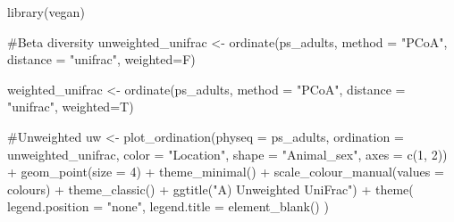 \documentclass[
  letterpaper,
  DIV=11,
  numbers=noendperiod]{scrartcl}
\newenvironment{Shaded}{\begin{snugshade}}{\end{snugshade}}
\newcommand{\AttributeTok}[1]{\textcolor[rgb]{0.40,0.45,0.13}{#1}}
\newcommand{\CommentTok}[1]{\textcolor[rgb]{0.37,0.37,0.37}{#1}}
\newcommand{\DecValTok}[1]{\textcolor[rgb]{0.68,0.00,0.00}{#1}}
\newcommand{\FunctionTok}[1]{\textcolor[rgb]{0.28,0.35,0.67}{#1}}
\newcommand{\NormalTok}[1]{\textcolor[rgb]{0.00,0.23,0.31}{#1}}
\newcommand{\OtherTok}[1]{\textcolor[rgb]{0.00,0.23,0.31}{#1}}
\newcommand{\SpecialCharTok}[1]{\textcolor[rgb]{0.37,0.37,0.37}{#1}}
\newcommand{\StringTok}[1]{\textcolor[rgb]{0.13,0.47,0.30}{#1}}
\begin{document}
\begin{Shaded}
\begin{Highlighting}[]
\FunctionTok{library}\NormalTok{(vegan)}

\CommentTok{\#Beta diversity}
\NormalTok{unweighted\_unifrac }\OtherTok{\textless{}{-}} \FunctionTok{ordinate}\NormalTok{(ps\_adults, }
                               \AttributeTok{method =} \StringTok{"PCoA"}\NormalTok{, }
                               \AttributeTok{distance =} \StringTok{"unifrac"}\NormalTok{, }\AttributeTok{weighted=}\NormalTok{F)}

\NormalTok{weighted\_unifrac }\OtherTok{\textless{}{-}} \FunctionTok{ordinate}\NormalTok{(ps\_adults, }
                               \AttributeTok{method =} \StringTok{"PCoA"}\NormalTok{, }
                               \AttributeTok{distance =} \StringTok{"unifrac"}\NormalTok{, }\AttributeTok{weighted=}\NormalTok{T)}

\CommentTok{\#Unweighted}
\NormalTok{uw }\OtherTok{\textless{}{-}} \FunctionTok{plot\_ordination}\NormalTok{(}\AttributeTok{physeq =}\NormalTok{ ps\_adults,}
                \AttributeTok{ordination =}\NormalTok{ unweighted\_unifrac,}
                \AttributeTok{color =} \StringTok{"Location"}\NormalTok{,}
                \AttributeTok{shape =} \StringTok{"Animal\_sex"}\NormalTok{,}
                \AttributeTok{axes =} \FunctionTok{c}\NormalTok{(}\DecValTok{1}\NormalTok{, }\DecValTok{2}\NormalTok{)) }\SpecialCharTok{+}
  \FunctionTok{geom\_point}\NormalTok{(}\AttributeTok{size =} \DecValTok{4}\NormalTok{) }\SpecialCharTok{+}
  \FunctionTok{theme\_minimal}\NormalTok{() }\SpecialCharTok{+}
  \FunctionTok{scale\_colour\_manual}\NormalTok{(}\AttributeTok{values =}\NormalTok{ colours) }\SpecialCharTok{+}
  \FunctionTok{theme\_classic}\NormalTok{() }\SpecialCharTok{+}
  \FunctionTok{ggtitle}\NormalTok{(}\StringTok{"A) Unweighted UniFrac"}\NormalTok{) }\SpecialCharTok{+}
  \FunctionTok{theme}\NormalTok{(}
    \AttributeTok{legend.position =} \StringTok{"none"}\NormalTok{,}
    \AttributeTok{legend.title =} \FunctionTok{element\_blank}\NormalTok{()}
\NormalTok{    ) }


\end{Highlighting}
\end{Shaded}
\end{document}
